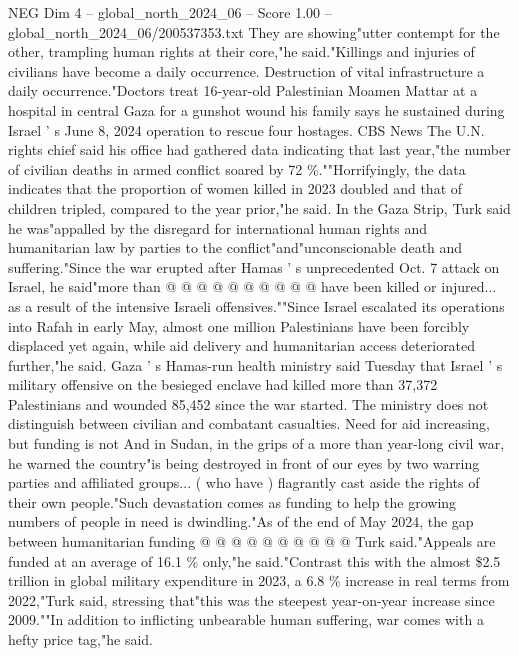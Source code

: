\begin{textsample}{NEG Dim 4 – global\_north\_2024\_06 – Score 1.00 – global\_north\_2024\_06/200537353.txt}  \label{ex:f4_neg_330}
They are showing"utter contempt for the other, trampling human rights at their core,"he said."Killings and injuries of civilians have become a daily occurrence.
Destruction of vital infrastructure a daily occurrence."Doctors treat 16-year-old Palestinian Moamen Mattar at a hospital in central Gaza for a gunshot wound his family says he sustained during Israel ' s June 8, 2024 operation to rescue four hostages.
CBS News The U.N. rights chief said his office had gathered data indicating that last year,"the number of civilian deaths in armed conflict soared by 72 \%.""Horrifyingly, the data indicates that the proportion of women killed in 2023 doubled and that of children tripled, compared to the year prior,"he said.
In the Gaza Strip, Turk said he was"appalled by the disregard for international human rights and humanitarian law by parties to the conflict"and"unconscionable death and suffering."Since the war erupted after Hamas ' s unprecedented Oct. 7 attack on Israel, he said"more than @ @ @ @ @ @ @ @ @ @ have been killed or injured... as a result of the intensive Israeli offensives.""Since Israel escalated its operations into Rafah in early May, almost one million Palestinians have been forcibly displaced yet again, while aid delivery and humanitarian access deteriorated further,"he said.
Gaza ' s Hamas-run health ministry said Tuesday that Israel ' s military offensive on the besieged enclave had killed more than 37,372 Palestinians and wounded 85,452 since the war started.
The ministry does not distinguish between civilian and combatant casualties.
Need for aid increasing, but funding is not And in Sudan, in the grips of a more than year-long civil war, he warned the country"is being destroyed in front of our eyes by two warring parties and affiliated groups... ( who have ) flagrantly cast aside the rights of their own people."Such devastation comes as funding to help the growing numbers of people in need is dwindling."As of the end of May 2024, the gap between humanitarian funding @ @ @ @ @ @ @ @ @ @ Turk said."Appeals are funded at an average of 16.1 \% only,"he said."Contrast this with the almost \$2.5 trillion in global military expenditure in 2023, a 6.8 \% increase in real terms from 2022,"Turk said, stressing that"this was the steepest year-on-year increase since 2009.""In addition to inflicting unbearable human suffering, war comes with a hefty price tag,"he said.

\end{textsample}
